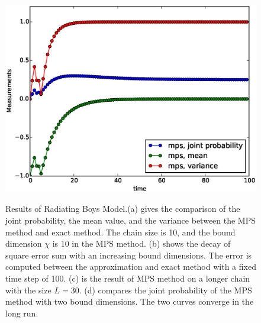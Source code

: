 \begin{figure}[htbp]
{\includegraphics[scale=0.4]{Result_Fig/Radiating_MPS_t100_s30_bd10.eps}}\hfill
{}
  \caption{Results of Radiating Boys Model.(a) gives the comparison of the joint probability, the mean value, and the variance between the MPS method and exact method. The chain size is 10, and the bound dimension $\chi$ is 10 in the MPS method. (b) shows the decay of square error sum with an increasing bound dimensions. The error is computed between the approximation and exact method with a fixed time step of 100. (c) is the result of MPS method on a longer chain with the size $L=30$. (d) compares the joint probability of the MPS method with two bound dimensions. The two curves converge in the long run.}
  \label{fig:Radiating_result}
\end{figure}

